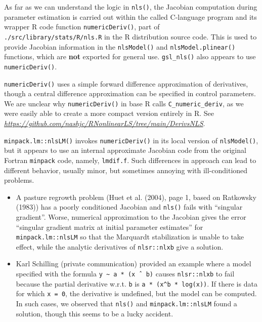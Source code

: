 As far as we can understand the logic in \texttt{nls()}, the Jacobian computation during
parameter estimation is carried out within the called C-language program
and its wrapper R code function \texttt{numericDeriv()}, part of
\texttt{./src/library/stats/R/nls.R}
in the R distribution source code. This is used to provide Jacobian information in
the \texttt{nlsModel()} and \texttt{nlsModel.plinear()} functions, which are \textbf{not} exported for
general use. \texttt{gsl\_nls()} also appears to use \texttt{numericDeriv()}.

\texttt{numericDeriv()} uses a
simple forward difference approximation of derivatives, though a central
difference approximation can be specified in control parameters.
We are unclear why \texttt{numericDeriv()} in base R calls \texttt{C\_numeric\_deriv},
as we were easily able to create a more compact version entirely in R.
See \emph{\url{https://github.com/nashjc/RNonlinearLS/tree/main/DerivsNLS}}.

\texttt{minpack.lm::nlsLM()} invokes \texttt{numericDeriv()} in its local
version of \texttt{nlsModel()}, but it appears to use an internal approximate Jacobian
code from
the original Fortran \texttt{minpack} code, namely, \texttt{lmdif.f}. Such differences in approach
can lead to different behavior, usually minor, but sometimes annoying with
ill-conditioned problems.

\begin{itemize}
\item
  A pasture regrowth problem (Huet et al. (2004), page 1, based on Ratkowsky (1983)) has a
  poorly conditioned Jacobian and \texttt{nls()} fails with ``singular gradient''.
  Worse, numerical approximation to the Jacobian gives the error
  ``singular gradient matrix at initial parameter estimates'' for \texttt{minpack.lm::nlsLM}
  so that the Marquardt stabilization is unable to take effect, while the analytic
  derivatives of \texttt{nlsr::nlxb} give a solution.
\item
  Karl Schilling (private communication) provided an example where a model specified
  with the formula \texttt{y\ \textasciitilde{}\ a\ *\ (x\ ˆ\ b)} causes \texttt{nlsr::nlxb} to fail because the partial
  derivative w.r.t. \texttt{b} is \texttt{a\ *\ (x\^{}b\ *\ log(x))}. If there is data for which \texttt{x\ =\ 0},
  the derivative is undefined, but the model can be computed. In such cases,
  we observed that \texttt{nls()} and
  \texttt{minpack.lm::nlsLM} found a solution, though this seems to be a lucky accident.
\end{itemize}

